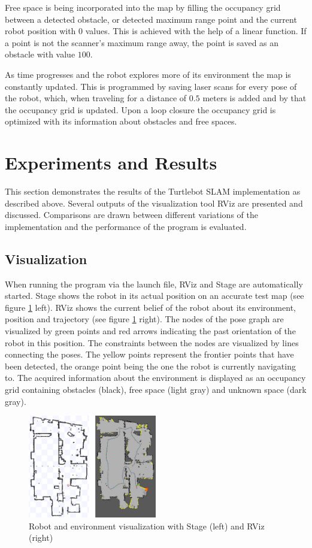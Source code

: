 \documentclass{ba-kecs}
\begin{document}
Free space is being incorporated into the map by filling the occupancy grid between a detected obstacle, or detected maximum range point and the current robot position with $0$ values. This is achieved with the help of a linear function. If a point is not the scanner's maximum range away, the point is saved as an obstacle with value $100$.

As time progresses and the robot explores more of its environment the map is constantly updated. This is programmed by saving laser scans for every pose of the robot, which, when traveling for a distance of $0.5$ meters is added and by that the occupancy grid is updated. Upon a loop closure the occupancy grid is optimized with its information about obstacles and free spaces.

\section{Experiments and Results}
This section demonstrates the results of the Turtlebot SLAM implementation as described above. Several outputs of the visualization tool RViz are presented and discussed. Comparisons are drawn between different variations of the implementation and the performance of the program is evaluated.

\subsection{Visualization}
When running the program via the launch file, RViz and Stage are automatically started. Stage shows the robot in its actual position on an accurate test map (see figure \ref{fig:stage_and_rviz} left). RViz shows the current belief of the robot about its environment, position and trajectory (see figure \ref{fig:stage_and_rviz} right). The nodes of the pose graph are visualized by green points and red arrows indicating the past orientation of the robot in this position. The constraints between the nodes are visualized by lines connecting the poses. The yellow points represent the frontier points that have been detected, the orange point being the one the robot is currently navigating to. The acquired information about the environment is displayed as an occupancy grid containing obstacles (black), free space (light gray) and unknown space (dark gray).

\begin{figure}[htbp]
	\centering
		\includegraphics[width=0.50\textwidth]{figures/Stage_and_rviz.jpg}
	\caption{Robot and environment visualization with Stage (left) and RViz (right)}
	\label{fig:stage_and_rviz}
\end{figure}
\end{document}
